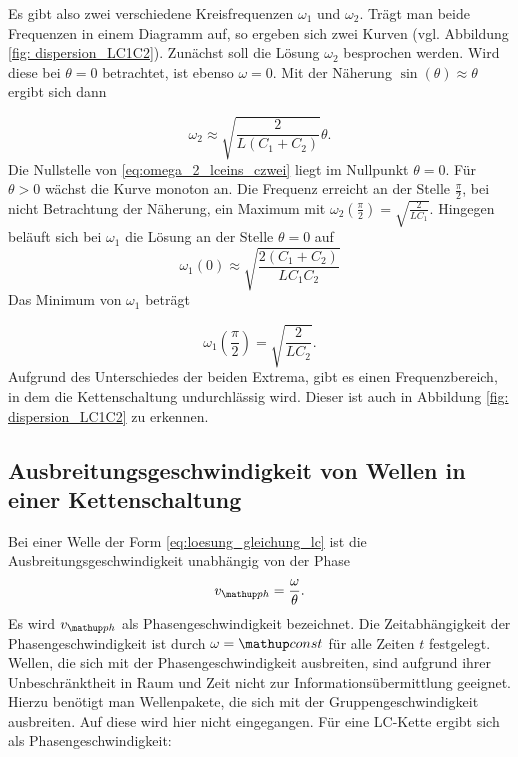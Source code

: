 Es gibt also zwei verschiedene Kreisfrequenzen $\omega_1$ und $\omega_2$.
Trägt man beide Frequenzen in einem Diagramm auf, so ergeben sich %
zwei Kurven (vgl. Abbildung \ref{fig: dispersion_LC1C2}).
Zunächst soll die Lösung $\omega_2$ besprochen werden.
Wird diese bei $\theta=0$ betrachtet, ist ebenso $\omega=0$.
Mit der Näherung $\sin(\theta)\approx\theta$ ergibt sich dann

\begin{equation}
\label{eq:omega_2_lceins_czwei}
\omega_2\approx\sqrt{\frac{2}{L\left(C_1+C_2\right)}}\theta.
\end{equation}
Die Nullstelle von \eqref{eq:omega_2_lceins_czwei} liegt im Nullpunkt $\theta=0$.
Für $\theta>0$ wächst die Kurve monoton an.
Die Frequenz erreicht an der Stelle $\frac{\pi}{2}$, bei nicht Betrachtung der Näherung,
ein Maximum mit $\omega_2(\frac{\pi}{2})=\sqrt{\frac{2}{LC_1}}$.
 \newline
Hingegen beläuft sich bei $\omega_1$ die Lösung an der Stelle $\theta=0$ auf
\begin{equation*}
\omega_1(0)\approx\sqrt{\frac{2(C_1+C_2)}{LC_1C_2}}
\end{equation*}
Das Minimum von $\omega_1$ beträgt

\begin{equation}
\label{eq:max_omega_1_ceins_czwei}
\omega_1(\frac{\pi}{2})=\sqrt{\frac{2}{LC_2}}.
\end{equation}
Aufgrund des Unterschiedes der beiden Extrema, gibt es einen Frequenzbereich, in dem %
die Kettenschaltung undurchlässig wird. Dieser ist auch in Abbildung \ref{fig: dispersion_LC1C2} %
zu erkennen.

\subsection{Ausbreitungsgeschwindigkeit von Wellen in einer Kettenschaltung}
Bei einer Welle der Form \eqref{eq:loesung_gleichung_lc} %
ist die Ausbreitungsgeschwindigkeit unabhängig von der Phase %
\begin{equation*}
v\ua{ph}=\frac{\omega}{\theta}.
\end{equation*}
Es wird $v\ua{ph}$ als Phasengeschwindigkeit bezeichnet.
Die Zeitabhängigkeit der Phasengeschwindigkeit ist durch $\omega=\map{const}$
für alle Zeiten $t$ festgelegt. Wellen, die sich mit der Phasengeschwindigkeit
ausbreiten, sind aufgrund ihrer Unbeschränktheit in Raum und Zeit nicht zur %
Informationsübermittlung geeignet. Hierzu benötigt man Wellenpakete, die sich
mit der Gruppengeschwindigkeit ausbreiten. Auf diese wird hier nicht eingegangen. %
Für eine LC-Kette ergibt sich als Phasengeschwindigkeit:

